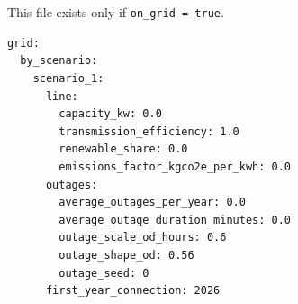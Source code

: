\documentclass[11pt,a4paper]{report}
\newcommand{\code}[1]{\texttt{#1}}
\begin{document}
\section{}

This file exists only if \code{on\_grid = true}.

\begin{lstlisting}[style=mgpy]
grid:
  by_scenario:
    scenario_1:
      line:
        capacity_kw: 0.0
        transmission_efficiency: 1.0
        renewable_share: 0.0
        emissions_factor_kgco2e_per_kwh: 0.0
      outages:
        average_outages_per_year: 0.0
        average_outage_duration_minutes: 0.0
        outage_scale_od_hours: 0.6
        outage_shape_od: 0.56
        outage_seed: 0
      first_year_connection: 2026
\end{lstlisting}
\end{document}
